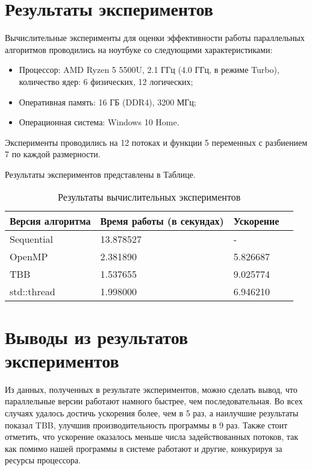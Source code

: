 \documentclass{report}
\begin{document}
\section*{Результаты экспериментов}
Вычислительные эксперименты для оценки эффективности работы параллельных алгоритмов проводились на ноутбуке со следующими характеристиками:
\begin{itemize}
\item Процессор: AMD Ryzen 5 5500U, 2.1 ГГц (4.0 ГГц, в режиме Turbo), количество ядер: 6 физических, 12 логических;
\item Оперативная память: 16 ГБ (DDR4), 3200 МГц;
\item Операционная система: Windows 10 Home.
\end{itemize}

\par Эксперименты проводились на 12 потоках и функции 5 переменных с разбиением 7 по каждой размерности. 

\par Результаты экспериментов представлены в Таблице.
\begin{table}[!h]
\caption{Результаты вычислительных экспериментов}
\centering
\begin{tabular}{| p{2cm} | p{3cm} | p{4cm} | p{2cm} |}
\hline
Версия алгоритма & Время работы (в секундах) & Ускорение  \\[5pt]
\hline
Sequential        & 13.878527        & -         \\
OpenMP        & 2.381890        & 5.826687         \\
TBB       & 1.537655        & 9.025774      \\
std::thread        &  1.998000        & 6.946210           \\

\hline
\end{tabular}
\end{table}

\newpage

\section*{Выводы из результатов экспериментов}
Из данных, полученных в результате экспериментов, можно сделать вывод, что параллельные версии работают намного быстрее, чем последовательная. Во всех случаях удалось достичь ускорения более, чем в 5 раз, а наилучшие результаты показал TBB, улучшив производительность программы в 9 раз. Также стоит отметить, что ускорение оказалось меньше числа задействованных потоков, так как помимо нашей программы в системе работают и другие, конкурируя за ресурсы процессора. 
\newpage
\end{document}
